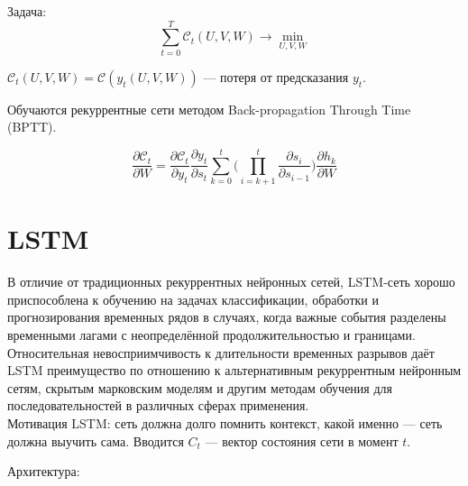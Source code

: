 \documentclass[11pt, oneside]{article}   	%
\begin{document}
	Задача:
	$$ \sum\limits_{t=0}^{T}\mathcal{C}_t(U, V, W) \rightarrow \min\limits_{U, V, W}$$
	
	$\mathcal{C}_t(U, V, W) = \mathcal{C}(y_t(U, V, W))$ --- потеря от предсказания $y_t$.
	
	Обучаются рекуррентные сети методом Back-propagation Through Time (BPTT).
	
	$$ \dfrac{\partial\mathcal{C}_t}{\partial W} = \dfrac{\partial\mathcal{C}_t}{\partial y_t} \dfrac{\partial y_t}{\partial s_t} \sum\limits_{k=0}^{t} \bigg(  \prod\limits_{i = k+1}^{t}  \dfrac{\partial s_i}{\partial s_{i-1}} \bigg)  \dfrac{\partial h_k}{\partial W}$$
	
	\begin{figure}[h]
	\end{figure}
	
	\newpage
	\section{LSTM}
	В отличие от традиционных рекуррентных нейронных сетей, LSTM-сеть хорошо приспособлена к обучению на задачах классификации, обработки и прогнозирования временных рядов в случаях, когда важные события разделены временными лагами с неопределённой продолжительностью и границами. Относительная невосприимчивость к длительности временных разрывов даёт LSTM преимущество по отношению к альтернативным рекуррентным нейронным сетям, скрытым марковским моделям и другим методам обучения для последовательностей в различных сферах применения.\\
	Мотивация LSTM: сеть должна долго помнить контекст, какой именно --- сеть должна выучить сама. Вводится $C_t$ --- вектор состояния сети в момент $t$.
	
	Архитектура: 
	\begin{figure}[h]
	\end{figure}
	
\end{document}
